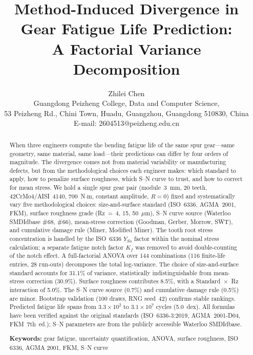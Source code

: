\documentclass[12pt,a4paper]{article}
\begin{document}
\title{\textbf{Method-Induced Divergence in Gear Fatigue Life Prediction:\\
A Factorial Variance Decomposition}}

\author{Zhilei Chen\\
Guangdong Peizheng College, Data and Computer Science,\\
53 Peizheng Rd., Chini Town, Huadu, Guangzhou, Guangdong 510830, China\\
E-mail: 2604513@peizheng.edu.cn}

\maketitle

\begin{abstract}
\label{sec:abstract}

When three engineers compute the bending fatigue life of the same spur
gear---same geometry, same material, same load---their predictions can
differ by four orders of magnitude. The divergence comes not from
material variability or manufacturing defects, but from the
methodological choices each engineer makes: which standard to apply, how
to penalize surface roughness, which S--N curve to trust, and how to
correct for mean stress. We hold a single spur gear pair
(module~3~mm, 20 teeth, 42CrMo4/AISI~4140, 700~N$\cdot$m, constant
amplitude, $R=0$) fixed and systematically vary five methodological
choices: size-and-surface standard (ISO~6336, AGMA~2001, FKM), surface
roughness grade (Rz~=~4, 15, 50~$\mu$m), S--N curve source (Waterloo
SMDIdbase \#68, \#66), mean-stress correction (Goodman, Gerber, Morrow,
SWT), and cumulative damage rule (Miner, Modified Miner). The tooth
root stress concentration is handled by the ISO~6336 $Y_{Sa}$ factor
within the nominal stress calculation; a separate fatigue notch factor
$K_f$ was removed to avoid double-counting of the notch effect. A
full-factorial ANOVA over 144 combinations (116 finite-life entries,
28 run-outs) decomposes the total log-variance. The choice of
size-and-surface standard accounts for 31.1\% of variance, statistically
indistinguishable from mean-stress correction (30.9\%). Surface
roughness contributes 8.5\%, with a Standard~$\times$~Rz interaction of
5.0\%. The S--N curve source (0.7\%) and cumulative damage rule (0.5\%)
are minor. Bootstrap validation (100 draws, RNG seed~42) confirms
stable rankings. Predicted fatigue life spans from $3.3\times10^2$ to
$3.1\times10^7$ cycles (5.0~dex). All formulas have been verified
against the original standards (ISO~6336-3:2019, AGMA~2001-D04,
FKM~7th~ed.); S--N parameters are from the publicly accessible Waterloo
SMDIdbase.

\textbf{Keywords:} gear fatigue, uncertainty quantification, ANOVA,
surface roughness, ISO 6336, AGMA 2001, FKM, S--N curve
\end{abstract}
\end{document}
